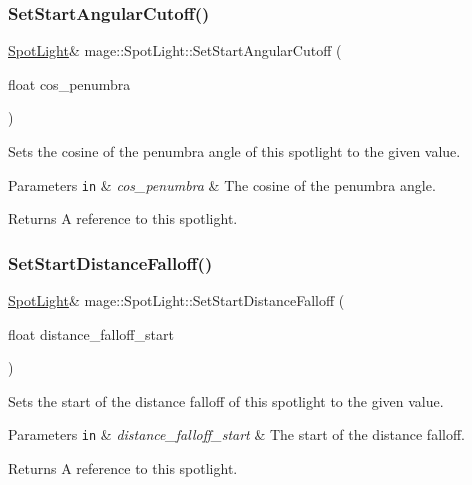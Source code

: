 \subsubsection{\texorpdfstring{Set\+Start\+Angular\+Cutoff()}{SetStartAngularCutoff()}}
{\footnotesize\ttfamily \hyperlink{classmage_1_1_spot_light}{Spot\+Light}\& mage\+::\+Spot\+Light\+::\+Set\+Start\+Angular\+Cutoff (\begin{DoxyParamCaption}\item[{float}]{cos\+\_\+penumbra }\end{DoxyParamCaption})}

Sets the cosine of the penumbra angle of this spotlight to the given value.


\begin{DoxyParams}[1]{Parameters}
\mbox{\tt in}  & {\em cos\+\_\+penumbra} & The cosine of the penumbra angle. \\
\hline
\end{DoxyParams}
\begin{DoxyReturn}{Returns}
A reference to this spotlight. 
\end{DoxyReturn}
\hypertarget{classmage_1_1_spot_light_a0e31dd3527aafc860e7a5c31aaf673d1}{}\label{classmage_1_1_spot_light_a0e31dd3527aafc860e7a5c31aaf673d1} 
\subsubsection{\texorpdfstring{Set\+Start\+Distance\+Falloff()}{SetStartDistanceFalloff()}}
{\footnotesize\ttfamily \hyperlink{classmage_1_1_spot_light}{Spot\+Light}\& mage\+::\+Spot\+Light\+::\+Set\+Start\+Distance\+Falloff (\begin{DoxyParamCaption}\item[{float}]{distance\+\_\+falloff\+\_\+start }\end{DoxyParamCaption})}

Sets the start of the distance falloff of this spotlight to the given value.


\begin{DoxyParams}[1]{Parameters}
\mbox{\tt in}  & {\em distance\+\_\+falloff\+\_\+start} & The start of the distance falloff. \\
\hline
\end{DoxyParams}
\begin{DoxyReturn}{Returns}
A reference to this spotlight. 
\end{DoxyReturn}
\hypertarget{classmage_1_1_spot_light_ac2d231f344d3070e3e7127a4c2da99d0}{}\label{classmage_1_1_spot_light_ac2d231f344d3070e3e7127a4c2da99d0} 
